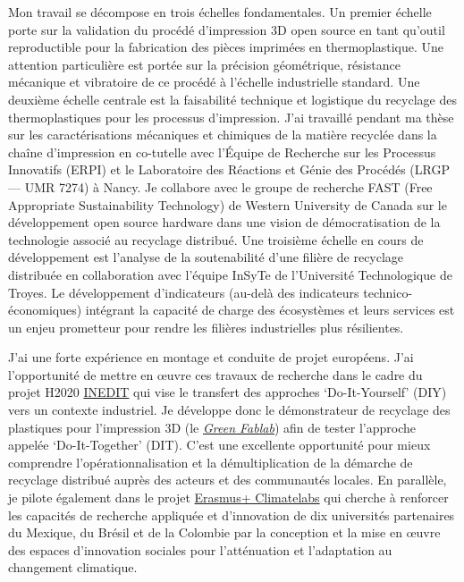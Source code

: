 \documentclass[
  11pt,
]{article}
\begin{document}
Mon travail se décompose en trois échelles fondamentales. Un premier
échelle porte sur la validation du procédé d'impression 3D open source
en tant qu'outil reproductible pour la fabrication des pièces imprimées
en thermoplastique. Une attention particulière est portée sur la
précision géométrique, résistance mécanique et vibratoire de ce procédé
à l'échelle industrielle standard. Une deuxième échelle centrale est la
faisabilité technique et logistique du recyclage des thermoplastiques
pour les processus d'impression. J'ai travaillé pendant ma thèse sur les
caractérisations mécaniques et chimiques de la matière recyclée dans la
chaîne d'impression en co-tutelle avec l'Équipe de Recherche sur les
Processus Innovatifs (ERPI) et le Laboratoire des Réactions et Génie des
Procédés (LRGP --- UMR 7274) à Nancy. Je collabore avec le groupe de
recherche FAST (Free Appropriate Sustainability Technology) de Western
University de Canada sur le développement open source hardware dans une
vision de démocratisation de la technologie associé au recyclage
distribué. Une troisième échelle en cours de développement est l'analyse
de la soutenabilité d'une filière de recyclage distribuée en
collaboration avec l'équipe InSyTe de l'Université Technologique de
Troyes. Le développement d'indicateurs (au-delà des indicateurs
technico-économiques) intégrant la capacité de charge des écosystèmes et
leurs services est un enjeu prometteur pour rendre les filières
industrielles plus résilientes.

J'ai une forte expérience en montage et conduite de projet européens.
J'ai l'opportunité de mettre en œuvre ces travaux de recherche dans le
cadre du projet H2020
\href{http://erpi.univ-lorraine.fr/projects/INEDIT/}{INEDIT} qui vise le
transfert des approches `Do-It-Yourself' (DIY) vers un contexte
industriel. Je développe donc le démonstrateur de recyclage des
plastiques pour l'impression 3D (le
\href{https://lf2l.fr/projects/green-fablab/\%5E\%5Bhttps://lf2l.fr/projects/green-fablab/\%5D}{\emph{Green
Fablab}}) afin de tester l'approche appelée `Do-It-Together' (DIT).
C'est une excellente opportunité pour mieux comprendre
l'opérationnalisation et la démultiplication de la démarche de recyclage
distribué auprès des acteurs et des communautés locales. En parallèle,
je pilote également dans le projet
\href{https://erpi.univ-lorraine.fr/fr/projects/Climatelabs/}{Erasmus+
Climatelabs} qui cherche à renforcer les capacités de recherche
appliquée et d'innovation de dix universités partenaires du Mexique, du
Brésil et de la Colombie par la conception et la mise en œuvre des
espaces d'innovation sociales pour l'atténuation et l'adaptation au
changement climatique.
\end{document}
